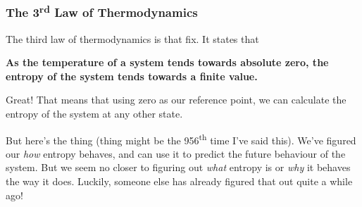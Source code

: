 \subsubsection{\texorpdfstring{The 3\textsuperscript{rd} Law of Thermodynamics}{The 3rd Law of Thermodynamics}}
The third law of thermodynamics is that fix. It states that
\begin{center}
    \textbf{As the temperature of a system tends towards absolute zero, the entropy of the system tends towards a finite value.}
\end{center}
Great! That means that using zero as our reference point, we can calculate the entropy of the system at any other state.

But here's the thing (thing might be the 956\textsuperscript{th} time I've said this). We've figured our \textit{how} entropy behaves, and can use it to predict the future behaviour of the system. But we seem no closer to figuring out \textit{what} entropy is or \textit{why} it behaves the way it does. Luckily, someone else has already figured that out quite a while ago!